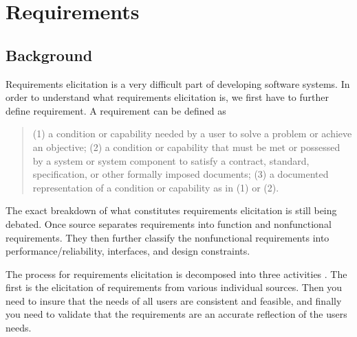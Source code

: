 \section{Requirements}

\subsection{Background}
Requirements elicitation is a very difficult part of developing software systems. In order to understand what requirements elicitation is, we first have to further define requirement. A requirement can be defined as
\begin{quote}
	(1) a condition or capability needed by a user to solve a problem or achieve an objective; (2) a condition or capability that must be met or possessed by a system or system component to satisfy a contract, standard, specification, or other formally imposed documents; (3) a documented representation of a condition or capability as in (1) or (2)\cite{september1990ieee}.
\end{quote}

The exact breakdown of what constitutes requirements elicitation is still being debated. Once source separates requirements into function and nonfunctional requirements\cite{southwell1987requirements}. They then further classify the nonfunctional requirements into performance/reliability, interfaces, and design constraints.

The process for requirements elicitation is decomposed into three activities \cite{rzepka1989requirements}. The first is the elicitation of requirements from various individual sources. Then you need to insure that the needs of all users are consistent and feasible, and finally you need to validate that the requirements are an accurate reflection of the users needs.

